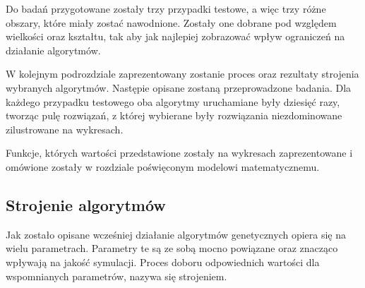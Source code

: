 \documentclass[twoside]{iisthesis}
\begin{document}
Do badań przygotowane zostały trzy przypadki testowe, a więc trzy różne obszary, które miały zostać nawodnione. Zostały one dobrane pod względem wielkości oraz kształtu, tak aby jak najlepiej zobrazować wpływ ograniczeń na działanie algorytmów.

W kolejnym podrozdziale zaprezentowany zostanie proces oraz rezultaty strojenia wybranych algorytmów. Następie opisane zostaną przeprowadzone badania. Dla każdego przypadku testowego oba algorytmy uruchamiane były dziesięć razy, tworząc pulę rozwiązań, z której wybierane były rozwiązania niezdominowane zilustrowane na wykresach.

Funkcje, których wartości przedstawione zostały na wykresach zaprezentowane i omówione zostały w rozdziale poświęconym modelowi matematycznemu.
\subsection{Strojenie algorytmów}
Jak zostało opisane wcześniej działanie algorytmów genetycznych opiera się na wielu parametrach. Parametry te są ze sobą mocno powiązane oraz znacząco wpływają na jakość symulacji. Proces doboru odpowiednich wartości dla wspomnianych parametrów, nazywa się strojeniem.
\end{document}
